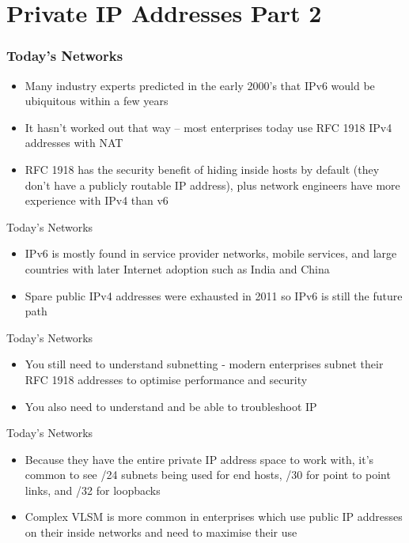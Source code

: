 \documentclass[pdflatex,compress]{beamer}
\begin{document}
\section{Private IP Addresses Part 2}

\begin{frame}
	\frametitle{Today’s Networks}
	\begin{itemize}
		\item Many industry experts predicted in the early 2000’s that IPv6 would be ubiquitous within a few years
		\item It hasn’t worked out that way – most enterprises today use RFC 1918 IPv4 addresses with NAT
		\item RFC 1918 has the security benefit of hiding inside hosts by default (they don’t have a publicly routable IP address), plus network engineers have more experience with IPv4 than v6
	\end{itemize}
\end{frame}

\begin{frame}{Today’s Networks}
	\begin{itemize}
		\item IPv6 is mostly found in service provider networks, mobile services, and large countries with later Internet adoption such as India and China
		\item Spare public IPv4 addresses were exhausted in 2011 so IPv6 is still the future path
	\end{itemize}
\end{frame}

\begin{frame}{Today’s Networks}
	\begin{itemize}
		\item You still need to understand subnetting - modern enterprises subnet their RFC 1918 addresses to optimise performance and security
		\item You also need to understand and be able to troubleshoot IP
	\end{itemize}
\end{frame}

\begin{frame}{Today’s Networks}
	\begin{itemize}
		\item Because they have the entire private IP address space to work with, it’s common to see /24 subnets being used for end hosts, /30 for point to point links, and /32 for loopbacks
		\item Complex VLSM is more common in enterprises which use public IP addresses on their inside networks and need to maximise their use
	\end{itemize}
\end{frame}
\end{document}
